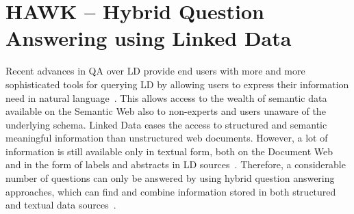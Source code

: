\chapter{HAWK -- Hybrid Question Answering using Linked Data}
\label{cha:hawk}
Recent advances in \ac{QA} over \ac{LD} provide end users with more and more sophisticated tools for querying \ac{LD} by allowing users to express their information need in natural language~\cite{SINA_WebSemantic,pythia,template}. 
This allows access to the wealth of semantic data available on the Semantic Web also to non-experts and users unaware of the underlying schema. 
Linked Data eases the access to structured and semantic meaningful information than unstructured web documents.
However, a lot of information is still available only in textual form, both on the Document Web and in the form of labels and abstracts in \ac{LD} sources~\cite{GER+13}.
Therefore, a considerable number of questions can only be answered by using hybrid question answering approaches, which  can find and combine information stored in both structured and textual data sources~\cite{combiningLDandIR}.

